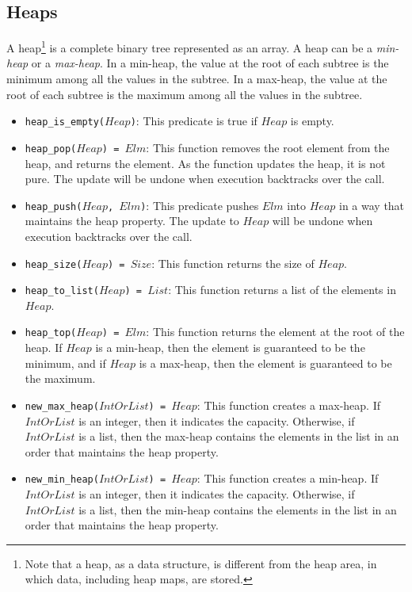 \subsection{Heaps}
A heap\footnote{Note that a heap, as a data structure, is different from the heap area, in which data, including heap maps, are stored.} is a complete binary tree represented as an array. A heap can be a \emph{min-heap} or a \emph{max-heap}. In a min-heap, the value at the root of each subtree is the minimum among all the values in the subtree. In a max-heap, the value at the root of each subtree is the maximum among all the values in the subtree.
\begin{itemize}
\item \texttt{heap\_is\_empty($Heap$)}: This predicate is true if $Heap$ is empty.
\item \texttt{heap\_pop($Heap$) = $Elm$}: This function removes the root element from the heap, and returns the element. As the function updates the heap, it is not pure. The update will be undone when execution backtracks over the call.
\item \texttt{heap\_push($Heap$, $Elm$)}: This predicate pushes $Elm$ into $Heap$ in a way that maintains the heap property. The update to $Heap$ will be undone when execution backtracks over the call.
\item \texttt{heap\_size($Heap$) = $Size$}: This function returns the size of $Heap$.
\item \texttt{heap\_to\_list($Heap$) = $List$}: This function returns a list of the elements in $Heap$.
\item \texttt{heap\_top($Heap$) = $Elm$}: This function returns the element at the root of the heap. If $Heap$ is a min-heap, then the element is guaranteed to be the minimum, and if $Heap$ is a max-heap, then the element is guaranteed to be the maximum.
\item \texttt{new\_max\_heap($IntOrList$) = $Heap$}: This function creates a max-heap.  If $IntOrList$ is an integer, then it indicates the capacity.  Otherwise, if $IntOrList$ is a list, then the max-heap contains the elements in the list in an order that maintains the heap property.
\item \texttt{new\_min\_heap($IntOrList$) = $Heap$}: This function creates a min-heap.  If $IntOrList$ is an integer, then it indicates the capacity.  Otherwise, if $IntOrList$ is a list, then the min-heap contains the elements in the list in an order that maintains the heap property.
\end{itemize}

